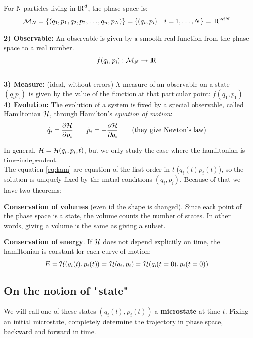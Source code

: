 For N particles living in ${\rm I\!R}^d$, the phase space is:
$$\mathcal{M}_N = \{(q_1,p_1, q_2, p_2, \dots, q_n,p_N)\} = \{(q_i,p_i)\quad i = 1,\dots, N\} = {\rm I\!R}^{2dN}
$$

\textbf{2) Observable:} An observable is given by a smooth real function from the phase space to a real number.
$$f(q_i,p_i) : \mathcal{M}_N \to {\rm I\!R}$$
\\

\textbf{3) Measure:} (ideal, without errors) A measure of an observable on a state $(\bar q_i \bar p_i)$ is given by the value of the function at that particular point: $f(\bar q_1, \bar p_1)$\\

\textbf{4) Evolution:} The evolution of a system is fixed by a special observable, called Hamiltonian $\mathcal{H}$, through Hamilton's \textit{equation of motion}:
\begin{equation} \label{eq:ham}
\dot q_i = \frac{\partial\mathcal{H}}{\partial p_i} \qquad \dot p_i = -\frac{\partial\mathcal{H}}{\partial q_i} \qquad \text{(they give Newton's law)}
\end{equation}

In general, $\mathcal{H} = \mathcal{H}(q_i, p_i, t)$, but we only study the case where the hamiltonian is time-independent.\\

The equation \ref{eq:ham} are equation of the first order in $t$ ($q_i(t) p_i(t)$), so the solution is uniquely fixed by the initial conditions $(\bar q_i, \bar p_i)$. Because of that we have two theorems:

\textbf{Conservation of volumes} (even id the shape is changed).
Since each point of the phase space is a state, the volume counts the number of states. In other words, giving a volume is the same as giving a subset.

\textbf{Conservation of energy}. If $\mathcal{H}$ does not depend explicitly on time, the hamiltonian is constant for each curve of motion:
$$ E= \mathcal{H} (q_i(t), p_i(t)) = \mathcal{H}(\bar q_i, \bar p_i) = \mathcal{H} (q_i(t=0), p_i(t=0))$$ 

\subsection{On the notion of "state"}
We will call one of these states $(q_i(t), p_i(t))$ a \textbf{microstate} at time $t$. Fixing an initial microstate, completely determine the trajectory in phase space, backward and forward in time. 


